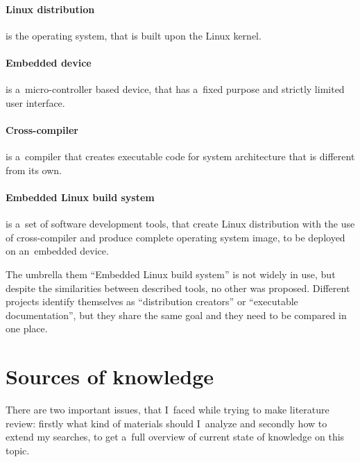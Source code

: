 \documentclass[printmode]{mgr}
\begin{document}
\paragraph{Linux distribution} is the operating system, that is built upon the Linux kernel.


\paragraph{Embedded device} is a~micro-controller based device, that has a~fixed purpose and strictly limited user interface.

\paragraph{Cross-compiler} is a~compiler that creates executable code for system architecture that is different from its own.

\paragraph{Embedded Linux build system} is a~set of software development tools, that create Linux distribution with the use of cross-compiler and produce complete operating system image, to be deployed on an~embedded device.

The umbrella them ``Embedded Linux build system'' is not widely in use, but despite the similarities between described tools, no other was proposed. Different projects identify themselves as ``distribution creators'' or ``executable documentation'', but they share the same goal and they need to be compared in one place.

\section{Sources of knowledge}
\label{section:sources-of-knowledge}

There are two important issues, that I~faced while trying to make literature review: firstly what kind of materials should I~analyze and secondly how to extend my searches, to get a~full overview of current state of knowledge on this topic.
\end{document}
